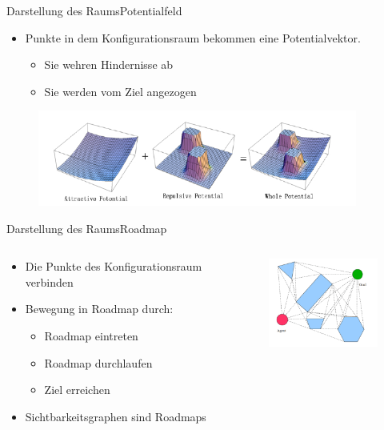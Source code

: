 \documentclass[t,aspectratio=169,dvipsnames]{beamer}
\begin{document}
\begin{frame}{Darstellung des Raums}{Potentialfeld}
	\begin{itemize}
		\item Punkte in dem Konfigurationsraum bekommen eine Potentialvektor.
		\begin{itemize}
			\item Sie wehren Hindernisse ab
			\item Sie werden vom Ziel angezogen
		\end{itemize}
	\end{itemize}
	
	\begin{figure}
		\includegraphics[width=10.5cm]{images/Potential_Field.png}
	\end{figure}
\end{frame}
\begin{frame}{Darstellung des Raums}{Roadmap}
	\begin{columns}
		\begin{column}[T]{0.6\textwidth}
			\begin{itemize}
				\item Die Punkte des Konfigurationsraum verbinden
				\item Bewegung in Roadmap durch:
				\begin{itemize}
					\item Roadmap eintreten
					\item Roadmap durchlaufen
					\item Ziel erreichen
				\end{itemize}
				\item Sichtbarkeitsgraphen sind Roadmaps	
			\end{itemize}
		\end{column}
		\begin{column}[T]{0.4\textwidth}
			\begin{figure}
				\includegraphics[width=4.5cm]{images/Bild3.png}
			\end{figure}
		\end{column}
	\end{columns}
\end{frame}
\end{document}
